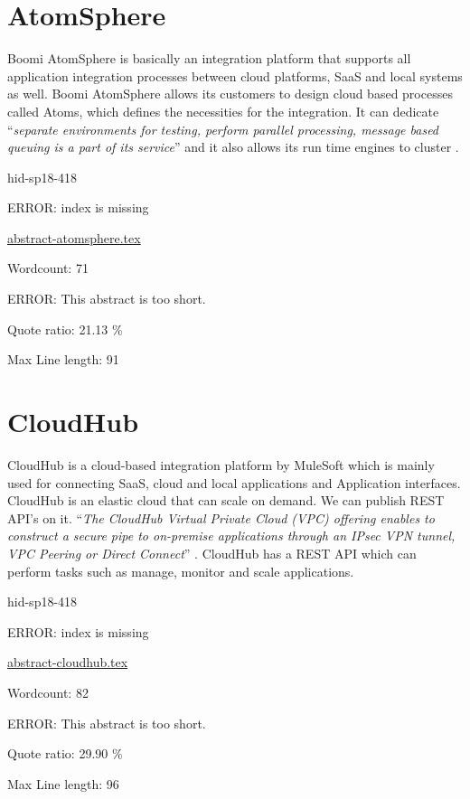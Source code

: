 \section{AtomSphere}

Boomi AtomSphere is basically an integration platform that supports all 
application integration processes between cloud platforms, SaaS and local 
systems as well. Boomi AtomSphere allows its customers to design cloud based 
processes called Atoms, which defines the necessities for the integration.
It can dedicate \color{blue}``\emph{separate environments for testing, perform 
parallel processing, message based queuing is a part of its service}''\color{black} and it 
also allows its run time engines to cluster 
\cite{hid-sp18-418-AtomSphere-features}. 


\begin{IU}

hid-sp18-418

ERROR: index is missing

\href{https://github.com/cloudmesh-community/hid-sp18-418/blob/master//technology/abstract-atomsphere.tex}{abstract-atomsphere.tex}

 

Wordcount: 71

ERROR: This abstract is too short.


Quote ratio: 21.13 \%
 
Max Line length: 91
\end{IU}

\section{CloudHub}

CloudHub is a cloud-based integration platform by MuleSoft which is mainly 
used for connecting SaaS, cloud and local applications and Application 
interfaces. CloudHub is an elastic cloud that can scale on demand. We can 
publish REST API's on it. \color{blue}``\emph{The CloudHub Virtual Private Cloud (VPC) offering 
enables to construct a secure pipe to on-premise applications through an 
IPsec VPN tunnel, VPC Peering or Direct Connect}''\color{black} 
\cite{hid-sp18-418-CloudHub-docs}. CloudHub has a REST API which can perform 
tasks such as manage, monitor and scale applications.



\begin{IU}

hid-sp18-418

ERROR: index is missing

\href{https://github.com/cloudmesh-community/hid-sp18-418/blob/master//technology/abstract-cloudhub.tex}{abstract-cloudhub.tex}

 

Wordcount: 82

ERROR: This abstract is too short.


Quote ratio: 29.90 \%
 
Max Line length: 96
\end{IU}

